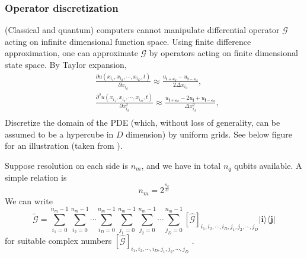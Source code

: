 \documentclass[11pt]{article}
\theoremstyle{definition}
\begin{document}
\subsubsection{Operator discretization}
(Classical and quantum) computers cannot manipulate  differential operator $\mathcal{G}$ acting on infinite dimensional function space. Using finite difference approximation, one can approximate $\mathcal{G}$ by operators acting on finite dimensional state space. By Taylor expansion,
$$
\begin{aligned}
& \frac{\partial u\left(x_{i_1}, x_{i_2}, \cdots, x_{i_D}, t\right)}{\partial x_{i_d}} \approx \frac{u_{\mathbf{i}+\mathbf{e}_d}-u_{\mathbf{i}-\mathbf{e}_d}}{2 \Delta x_{i_d}}, \\
& \frac{\partial^2 u\left(x_{i_1}, x_{i_2}, \cdots, x_{i_D}, t\right)}{\partial x_{i_d}^2} \approx \frac{u_{\mathbf{i}+\mathbf{e}_d}-2 u_{\mathbf{i}}+u_{\mathbf{i}-\mathbf{e}_d}}{\Delta x_{i_d}^2}, \\
&
\end{aligned}
$$
Discretize the domain of the PDE (which, without loss of generality, can be assumed to be a hypercube in $D$ dimension) by uniform grids. See below figure for an illustration (taken from \cite{alghassi_variational_2022}).

\begin{center}
\end{center}


Suppose resolution on each side is $n_m$, and we have in total $n_q$ qubits available. A simple relation is $$n_m=2^{\frac{n_q}{D}}$$
We can write
$$
\tilde{\mathcal{G}}=\sum_{i_1=0}^{n_m-1} \sum_{i_2=0}^{n_m-1} \cdots \sum_{i_D=0}^{n_m-1} \sum_{j_1=0}^{n_m-1} \sum_{j_2=0}^{n_m-1} \cdots \sum_{j_D=0}^{n_m-1}[\hat{\mathcal{G}}]_{i_1, i_2, \cdots, i_D, j_1, j_2, \cdots, j_D}|\mathbf{i}\rangle\langle\mathbf{j}|
$$ for suitable complex numbers $[\hat{\mathcal{G}}]_{i_1, i_2, \cdots, i_D, j_1, j_2, \cdots, j_D}$ .
\end{document}
